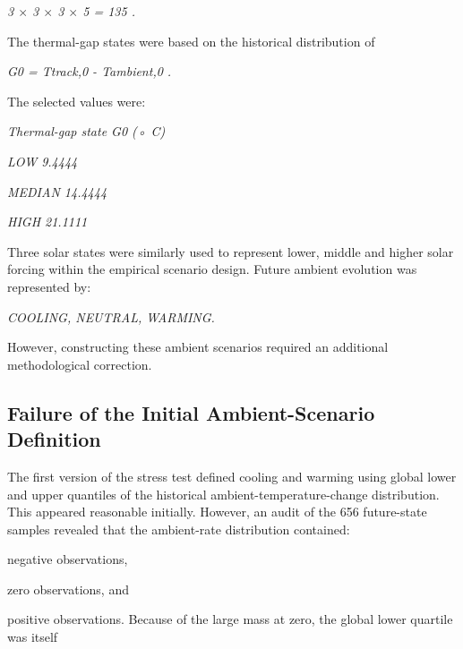 \begin{center}\textit{3 \ensuremath{\times} 3 \ensuremath{\times} 3 \ensuremath{\times} 5 = 135 .}\end{center}

The thermal-gap states were based on the historical distribution of

\begin{center}\textit{G0 = Ttrack,0 - Tambient,0 .}\end{center}

The selected values were:

\begin{center}\textit{Thermal-gap state    G0 (◦ C)}\end{center}

\begin{center}\textit{LOW                   9.4444}\end{center}

\begin{center}\textit{MEDIAN               14.4444}\end{center}

\begin{center}\textit{HIGH                 21.1111}\end{center}

Three solar states were similarly used to represent lower, middle and higher solar forcing within the empirical scenario design. Future ambient evolution was represented by:

\begin{center}\textit{COOLING,         NEUTRAL,          WARMING.}\end{center}

However, constructing these ambient scenarios required an additional methodological correction.

\subsection{Failure of the Initial Ambient-Scenario Definition}
The first version of the stress test defined cooling and warming using global lower and upper quantiles of the historical ambient-temperature-change distribution. This appeared reasonable initially. However, an audit of the 656 future-state samples revealed that the ambient-rate distribution contained:

negative observations,

zero observations, and

positive observations. Because of the large mass at zero, the global lower quartile was itself


